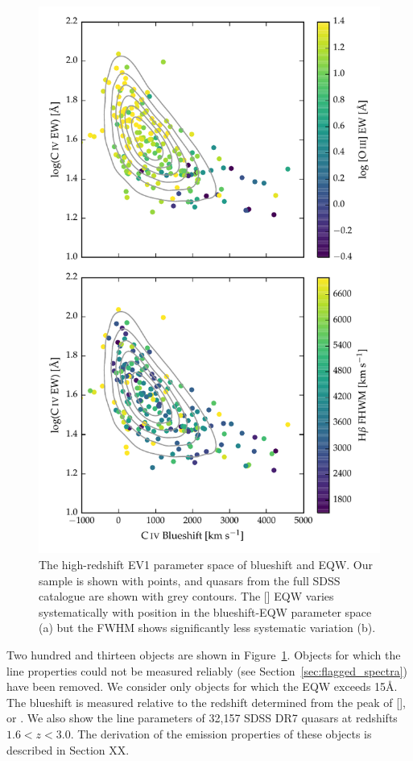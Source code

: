 \begin{figure}
    \includegraphics[width=\columnwidth]{figures/chapter04/ev1.pdf} 
    \caption[{The high-redshift EV1 parameter space of  blueshift and EQW.}]{The high-redshift EV1 parameter space of  blueshift and EQW. Our sample is shown with points, and quasars from the full SDSS catalogue are shown with grey contours. The [] EQW varies systematically with position in the  blueshift-EQW parameter space (a) but the \hb FWHM shows significantly less systematic variation (b).}      
    \label{fig:ev1}
\end{figure}

Two hundred and thirteen objects are shown in Figure~\ref{fig:ev1}.
Objects for which the  line properties could not be measured reliably (see Section~\ref{sec:flagged_spectra}) have been removed. 
We consider only objects for which the  EQW exceeds 15\AA. 
The  blueshift is measured relative to the redshift determined from the peak of [], \hb or \hans. 
We also show the  line parameters of 32,157 SDSS DR7 quasars at redshifts $1.6 < z < 3.0$. 
The derivation of the  emission properties of these objects is described in Section XX. 

